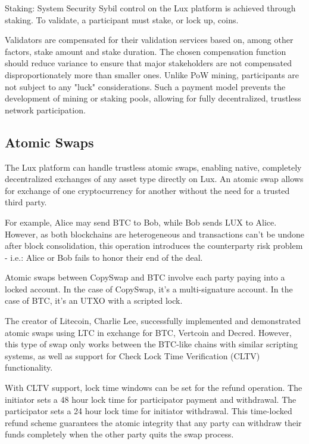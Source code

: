 \documentclass[11pt]{article}
\begin{document}
Staking: System Security Sybil control on the Lux platform is achieved through staking. To validate, a participant must stake, or lock up, coins.


Validators are compensated for their validation services based on, among other factors, stake amount and stake duration. The chosen compensation function should reduce variance to ensure that major stakeholders are not compensated disproportionately more than smaller ones. Unlike PoW mining, participants are not subject to any "luck" considerations. Such a payment model prevents the development of mining or staking pools, allowing for fully decentralized, trustless network participation.


\subsection{Atomic Swaps}

The Lux platform can handle trustless atomic swaps, enabling native, completely decentralized exchanges of any asset type directly on Lux. An atomic swap allows for exchange of one cryptocurrency for another without the need for a trusted third party.


For example, Alice may send BTC to Bob, while Bob sends LUX to Alice. However, as both blockchains are heterogeneous and transactions can't be undone after block consolidation, this operation introduces the counterparty risk problem - i.e.: Alice or Bob fails to honor their end of the deal.


Atomic swaps between CopySwap and BTC involve each party paying into a locked account. In the case of CopySwap, it's a multi-signature account. In the case of BTC, it's an UTXO with a scripted lock.


The creator of Litecoin, Charlie Lee, successfully implemented and demonstrated atomic swaps using LTC in exchange for BTC, Vertcoin and Decred. However, this type of swap only works between the BTC-like chains with similar scripting systems, as well as support for Check Lock Time Verification (CLTV) functionality.


With CLTV support, lock time windows can be set for the refund operation. The initiator sets a 48 hour lock time for participator payment and withdrawal. The participator sets a 24 hour lock time for initiator withdrawal. This time-locked refund scheme guarantees the atomic integrity that any party can withdraw their funds completely when the other party quits the swap process.
\end{document}
